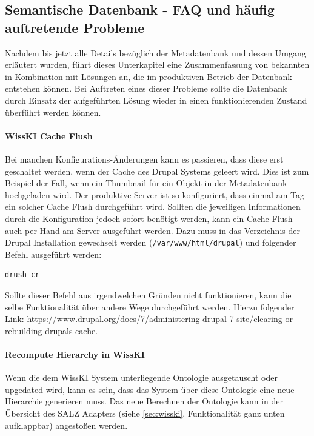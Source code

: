 \subsection{Semantische Datenbank - FAQ und häufig auftretende Probleme}\label{sec:faqSW}

Nachdem bis jetzt alle Details bezüglich der Metadatenbank und dessen Umgang erläutert wurden, führt dieses Unterkapitel eine Zusammenfassung von bekannten  in Kombination mit Lösungen an, die im produktiven Betrieb der Datenbank entstehen können. Bei Auftreten eines dieser Probleme sollte die Datenbank durch Einsatz der aufgeführten Lösung wieder in einen funktionierenden Zustand überführt werden können.

\paragraph{WissKI Cache Flush}

Bei manchen Konfigurations-Änderungen kann es passieren, dass diese erst  geschaltet werden, wenn der Cache des Drupal Systems geleert wird. Dies ist zum Beispiel der Fall, wenn ein Thumbnail für ein Objekt in der Metadatenbank hochgeladen wird. Der produktive Server ist so konfiguriert, dass einmal am Tag ein solcher Cache Flush durchgeführt wird. Sollten die jeweiligen Informationen durch die Konfiguration jedoch sofort benötigt werden, kann ein Cache Flush auch per Hand am Server ausgeführt werden. Dazu muss in das Verzeichnis der Drupal Installation gewechselt werden (\texttt{/var/www/html/drupal}) und folgender Befehl ausgeführt werden:

\begin{lstlisting}[style=MyBashStyle, caption={Befehl für einen Cache Flush eines Drupal Systems.}]
drush cr 
\end{lstlisting}

	Sollte dieser Befehl aus irgendwelchen Gründen nicht funktionieren, kann die selbe Funktionalität über andere Wege durchgeführt werden. Hierzu folgender Link: \url{https://www.drupal.org/docs/7/administering-drupal-7-site/clearing-or-rebuilding-drupals-cache}.

\paragraph{Recompute Hierarchy in WissKI}

Wenn die dem WissKI System unterliegende Ontologie ausgetauscht oder upgedated wird, kann es sein, dass das System über diese Ontologie eine neue Hierarchie generieren muss. Das neue Berechnen der Ontologie kann in der Übersicht des SALZ Adapters (siehe \autoref{sec:wisski}, Funktionalität ganz unten aufklappbar) angestoßen werden.

